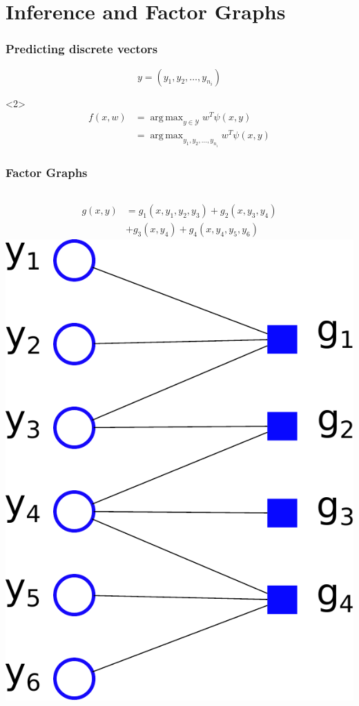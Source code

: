 \documentclass[final,ignorenonframetext,compress]{beamer}
\DeclareMathOperator*{\argmax}{arg\,max}
\begin{document}
\section{Inference and Factor Graphs}
\begin{frame}
    \frametitle{Predicting discrete vectors}
    \[y = (y_1, y_2, \dotsc, y_{n_i})\]
    \begin{visibleenv}<2>
        \begin{align*}
        f(x, w) &= \argmax_{y \in \mathcal{Y}}  w^T \psi(x, y)\\
            &= \argmax_{y_1, y_2, \dotsc, y_{n_i}} w^T \psi(x, y)
        \end{align*}
    \end{visibleenv}
\end{frame}

\begin{frame}
    \frametitle{Factor Graphs}
    \begin{columns}[c]
        \begin{align*}
        g(x, y) &= g_1(x, y_1, y_2, y_3) + g_2(x, y_3, y_4)\\
                &+ g_3(x, y_4) + g_4(x, y_4, y_5, y_6)
        \end{align*}
            \includegraphics[width=\textwidth]{images/factor_graph_white_bg}
    \end{columns}
\end{frame}
\end{document}

